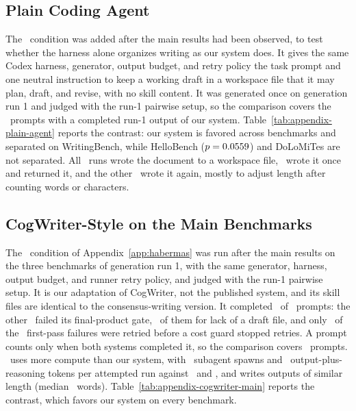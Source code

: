 \subsection{Plain Coding Agent}
\label{app:plain-agent}
The \condPlainAgent\ condition was added after the main results had been observed, to test whether the harness alone organizes writing as our system does.
It gives the same Codex harness, generator, output budget, and retry policy the task prompt and one neutral instruction to keep a working draft in a workspace file that it may plan, draft, and revise, with no skill content.
It was generated once on generation run 1 and judged with the run-1 pairwise setup, so the comparison covers the \FullPlainAgentAcrossN\ prompts with a completed run-1 output of our system.
Table~\ref{tab:appendix-plain-agent} reports the contrast: our system is favored across benchmarks and separated on WritingBench, while HelloBench ($p=0.0559$) and DoLoMiTes are not separated.
All \PlainAgentCompletedRuns\ runs wrote the document to a workspace file, \PlainAgentWrittenOnceRuns\ wrote it once and returned it, and the other \PlainAgentRevisedRuns\ wrote it again, mostly to adjust length after counting words or characters.


\subsection{CogWriter-Style on the Main Benchmarks}
\label{app:cogwriter-main}
The \condExploratoryOne\ condition of Appendix~\ref{app:habermas} was run after the main results on the three benchmarks of generation run 1, with the same generator, harness, output budget, and runner retry policy, and judged with the run-1 pairwise setup.
It is our adaptation of CogWriter, not the published system, and its skill files are identical to the consensus-writing version.
It completed \CogWriterStyleCompleted\ of \CogWriterStyleAttempted\ prompts: the other \CogWriterStyleFailed\ failed its final-product gate, \CogWriterStyleNoDraftFailed\ of them for lack of a draft file, and only \CogWriterStyleRetried\ of the \CogWriterStyleFirstPassFailed\ first-pass failures were retried before a cost guard stopped retries.
A prompt counts only when both systems completed it, so the comparison covers \FullCogWriterStyleAcrossN\ prompts.
\condExploratoryOne\ uses more compute than our system, with \CogWriterStyleSpawns\ subagent spawns and \CogWriterStyleOutputTokens\ output-plus-reasoning tokens per attempted run against \AfourSpawns\ and \AfourOutputTokens, and writes outputs of similar length (median \CogWriterStyleMedianOutput\ words).
Table~\ref{tab:appendix-cogwriter-main} reports the contrast, which favors our system on every benchmark.


